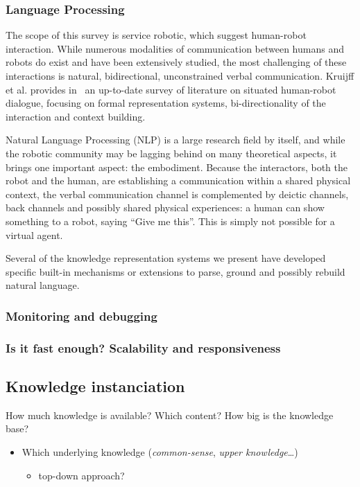 \documentclass[a4paper, twocolumn]{article}
\begin{document}
\subsubsection{Language Processing}
\label{sect|nlp}

The scope of this survey is service robotic, which suggest human-robot
interaction. While numerous modalities of communication between humans and
robots do exist and have been extensively studied, the most challenging of
these interactions is natural, bidirectional, unconstrained verbal
communication. Kruijff et al. provides in~\cite{Kruijff2010} an up-to-date
survey of literature on situated human-robot dialogue, focusing on formal
representation systems, bi-directionality of the interaction and context
building.

Natural Language Processing (NLP) is a large research field by itself, and
while the robotic community may be lagging behind on many theoretical aspects,
it brings one important aspect: the embodiment. Because the interactors, both
the robot and the human, are establishing a communication within a shared
physical context, the verbal communication channel is complemented by deictic
channels, back channels and possibly shared physical experiences: a human can
show something to a robot, saying ``Give me this''. This is simply not possible
for a virtual agent.

Several of the knowledge representation systems we present have developed
specific built-in mechanisms or extensions to parse, ground and possibly
rebuild natural language.

\subsubsection{Monitoring and debugging}
\label{sect|debugging}

\subsubsection{Is it fast enough? Scalability and responsiveness}
\label{sect|scalability}

\subsection{Knowledge instanciation}

How much knowledge is available? Which content? How big is the knowledge base?

\begin{itemize}
	\item  Which underlying knowledge (\emph{common-sense}, \emph{upper knowledge}\ldots{})
	\begin{itemize}
		\item  top-down approach?
	\end{itemize}

\end{itemize}
\end{document}
